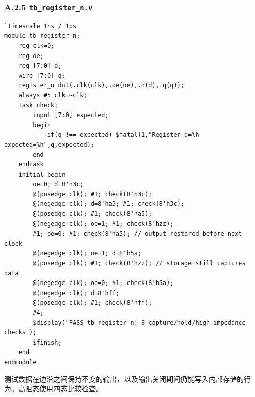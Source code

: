 \documentclass[12pt,a4paper]{ctexart}
\begin{document}
\subsubsection*{A.2.5 \texttt{tb\_register\_n.v}}
\begin{lstlisting}
`timescale 1ns / 1ps
module tb_register_n;
    reg clk=0;
    reg oe;
    reg [7:0] d;
    wire [7:0] q;
    register_n dut(.clk(clk),.oe(oe),.d(d),.q(q));
    always #5 clk=~clk;
    task check;
        input [7:0] expected;
        begin
            if(q !== expected) $fatal(1,"Register q=%h expected=%h",q,expected);
        end
    endtask
    initial begin
        oe=0; d=8'h3c;
        @(posedge clk); #1; check(8'h3c);
        @(negedge clk); d=8'ha5; #1; check(8'h3c);
        @(posedge clk); #1; check(8'ha5);
        @(negedge clk); oe=1; #1; check(8'hzz);
        #1; oe=0; #1; check(8'ha5); // output restored before next clock
        @(negedge clk); oe=1; d=8'h5a;
        @(posedge clk); #1; check(8'hzz); // storage still captures data
        @(negedge clk); oe=0; #1; check(8'h5a);
        @(negedge clk); d=8'hff;
        @(posedge clk); #1; check(8'hff);
        #4;
        $display("PASS tb_register_n: 8 capture/hold/high-impedance checks");
        $finish;
    end
endmodule
\end{lstlisting}
测试数据在边沿之间保持不变的输出，以及输出关闭期间仍能写入内部存储的行为。高阻态使用四态比较检查。
\end{document}
